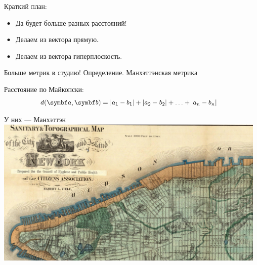 
\begin{frame} %


\end{frame}


\begin{frame}{Краткий план:}

\begin{itemize}[<+->]
  \item Да будет больше разных расстояний!
  \item Делаем из вектора прямую.
  \item Делаем из вектора гиперплоскость.
\end{itemize}

\end{frame}


\begin{frame}{Больше метрик в студию!}
 Определение. \alert{Манхэттэнская метрика}

  Расстояние по Майкопски:
  \[
  d(\ba, \bb) = \abs{a_1 - b_1}  + \abs{a_2 - b_2} + \ldots + \abs{a_n - b_n}
  \]

\end{frame}




\begin{frame}{У них — Манхэттэн}
\includegraphics[scale=0.5]{figures/video_010_manhattan.png}


\end{frame}




